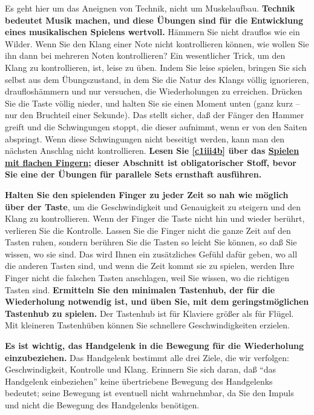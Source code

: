 Es geht hier um das Aneignen von Technik, nicht um Muskelaufbau.
\textbf{Technik bedeutet Musik machen, und diese Übungen sind für die Entwicklung eines musikalischen Spielens wertvoll.}
Hämmern Sie nicht drauflos wie ein Wilder.
Wenn Sie den Klang einer Note nicht kontrollieren können, wie wollen Sie ihn dann bei mehreren Noten kontrollieren?
Ein wesentlicher Trick, um den Klang zu kontrollieren, ist, leise zu üben.
Indem Sie leise spielen, bringen Sie sich selbst aus dem Übungszustand, in dem Sie die Natur des Klangs völlig ignorieren, draufloshämmern und nur versuchen, die Wiederholungen zu erreichen.
Drücken Sie die Taste völlig nieder, und halten Sie sie einen Moment unten (ganz kurz -- nur den Bruchteil einer Sekunde).
Das stellt sicher, daß der Fänger den Hammer greift und die Schwingungen stoppt, die dieser aufnimmt, wenn er von den Saiten abspringt.
Wenn diese Schwingungen nicht beseitigt werden, kann man den nächsten Anschlag nicht kontrollieren.
\textbf{Lesen Sie \autoref{c1iii4b} über das \hyperref[c1iii4b]{Spielen mit flachen Fingern}; dieser Abschnitt ist obligatorischer Stoff, bevor Sie eine der Übungen für parallele Sets ernsthaft ausführen.}

\textbf{Halten Sie den spielenden Finger zu jeder Zeit so nah wie möglich über der Taste}, um die Geschwindigkeit und Genauigkeit zu steigern und den Klang zu kontrollieren.
Wenn der Finger die Taste nicht hin und wieder berührt, verlieren Sie die Kontrolle.
Lassen Sie die Finger nicht die ganze Zeit auf den Tasten ruhen, sondern berühren Sie die Tasten so leicht Sie können, so daß Sie wissen, wo sie sind.
Das wird Ihnen ein zusätzliches Gefühl dafür geben, wo all die anderen Tasten sind, und wenn die Zeit kommt sie zu spielen, werden Ihre Finger nicht die falschen Tasten anschlagen, weil Sie wissen, wo die richtigen Tasten sind.
\textbf{Ermitteln Sie den minimalen Tastenhub, der für die Wiederholung notwendig ist, und üben Sie, mit dem geringstmöglichen Tastenhub zu spielen.}
Der Tastenhub ist für Klaviere größer als für Flügel.
Mit kleineren Tastenhüben können Sie schnellere Geschwindigkeiten erzielen.

\textbf{Es ist wichtig, das Handgelenk in die Bewegung für die Wiederholung einzubeziehen.}
Das Handgelenk bestimmt alle drei Ziele, die wir verfolgen: Geschwindigkeit, Kontrolle und Klang.
Erinnern Sie sich daran, daß \enquote{das Handgelenk einbeziehen} keine übertriebene Bewegung des Handgelenks bedeutet; seine Bewegung ist eventuell nicht wahrnehmbar, da Sie den Impuls und nicht die Bewegung des Handgelenks benötigen.

